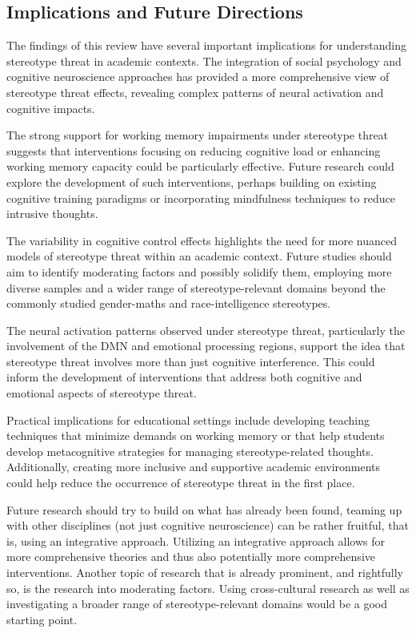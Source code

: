 \documentclass[
  stu, a4paper,floatsintext]{apa7}
\begin{document}
\subsection{Implications and Future Directions}\label{implications-and-future-directions}

The findings of this review have several important implications for understanding stereotype threat in academic contexts. The integration of social psychology and cognitive neuroscience approaches has provided a more comprehensive view of stereotype threat effects, revealing complex patterns of neural activation and cognitive impacts.

The strong support for working memory impairments under stereotype threat suggests that interventions focusing on reducing cognitive load or enhancing working memory capacity could be particularly effective. Future research could explore the development of such interventions, perhaps building on existing cognitive training paradigms or incorporating mindfulness techniques to reduce intrusive thoughts.

The variability in cognitive control effects highlights the need for more nuanced models of stereotype threat within an academic context. Future studies should aim to identify moderating factors and possibly solidify them, employing more diverse samples and a wider range of stereotype-relevant domains beyond the commonly studied gender-maths and race-intelligence stereotypes.

The neural activation patterns observed under stereotype threat, particularly the involvement of the DMN and emotional processing regions, support the idea that stereotype threat involves more than just cognitive interference. This could inform the development of interventions that address both cognitive and emotional aspects of stereotype threat.

Practical implications for educational settings include developing teaching techniques that minimize demands on working memory or that help students develop metacognitive strategies for managing stereotype-related thoughts. Additionally, creating more inclusive and supportive academic environments could help reduce the occurrence of stereotype threat in the first place.

Future research should try to build on what has already been found, teaming up with other disciplines (not just cognitive neuroscience) can be rather fruitful, that is, using an integrative approach. Utilizing an integrative approach allows for more comprehensive theories and thus also potentially more comprehensive interventions. Another topic of research that is already prominent, and rightfully so, is the research into moderating factors.
Using cross-cultural research as well as investigating a broader range of stereotype-relevant domains would be a good starting point.
\end{document}
